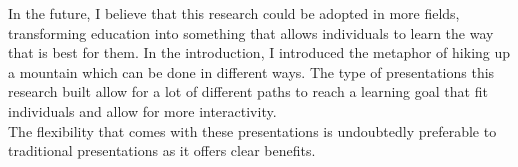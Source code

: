 \documentclass[twoside, 12pt]{article}
\begin{document}
In the future, I believe that this research could be adopted in more fields, transforming education into something that allows individuals to learn the way that is best for them. In the introduction, I introduced the metaphor of hiking up a mountain which can be done in different ways. The type of presentations this research built allow for a lot of different paths to reach a learning goal that fit individuals and allow for more interactivity.\\

The flexibility that comes with these presentations is undoubtedly preferable to traditional presentations as it offers clear benefits.\\

\newpage

{}

\end{document}
